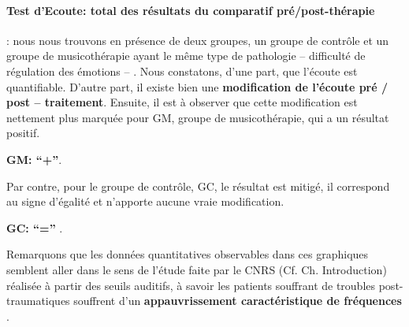  

\paragraph{Test d'Ecoute: total des résultats du comparatif pré/post-thérapie}
 : nous nous trouvons
           en présence de deux groupes, un groupe de contrôle et un
           groupe de musicothérapie ayant le même type de
           pathologie -- difficulté de régulation des émotions -- .
Nous constatons, d'une part, que l'écoute est quantifiable.
           D'autre part, il existe bien
          une \textbf{modification de l'écoute pré / post -- traitement}.
Ensuite, il est à observer que
          cette modification est nettement plus marquée
          pour GM, groupe de musicothérapie, qui a un résultat positif.


          \textbf{GM: ``+''}.


Par contre,  pour le groupe de contrôle, GC, le résultat est mitigé, il correspond au signe d'égalité et n'apporte aucune vraie modification.

          \textbf{GC:  ``='' }.


Remarquons que les données quantitatives observables dans
ces graphiques sem\-blent aller dans le
sens de  l'étude faite par le
CNRS (Cf. Ch. Introduction) réalisée à partir des seuils auditifs, à savoir
les patients souffrant de troubles post-traumatiques souffrent d'un
\textbf{appauvrissement caractéristique de fréquences} \autocite{affectiveDisorders}.

